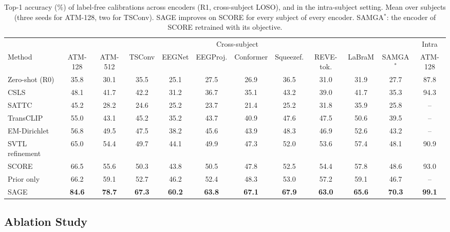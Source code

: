 \documentclass[10pt,twocolumn,letterpaper]{article}
\begin{document}
\begin{table}[t]
\caption{Top-1 accuracy (\%) of label-free calibrations across encoders (R1, cross-subject LOSO), and in the intra-subject setting. Mean over subjects (three seeds for ATM-128, two for TSConv). SAGE improves on SCORE for every subject of every encoder. SAMGA$^\ast$: the encoder of SCORE retrained with its objective.}
\label{tab:encoders}
\centering
\footnotesize
\setlength{\tabcolsep}{3pt}
\begin{tabular}{@{}lcccccccccc|c@{}}
\toprule
 & \multicolumn{10}{c|}{Cross-subject} & Intra \\
\cmidrule(lr){2-11}
Method & ATM-128 & ATM-512 & TSConv & EEGNet & EEGProj. & Conformer & Squeezef. & REVE-tok. & LaBraM & SAMGA$^\ast$ & ATM-128 \\
\midrule
Zero-shot (R0) & 35.8 & 30.1 & 35.5 & 25.1 & 27.5 & 26.9 & 36.5 & 31.0 & 31.9 & 27.7 & 87.8 \\
CSLS & 48.1 & 41.7 & 42.2 & 31.2 & 36.7 & 35.1 & 43.2 & 39.0 & 41.7 & 35.3 & 94.3 \\
SATTC~\cite{huang2026sattc} & 45.2 & 28.2 & 24.6 & 25.2 & 23.7 & 21.4 & 25.2 & 31.8 & 35.9 & 25.8 & -- \\
TransCLIP~\cite{zanella2024transclip} & 55.0 & 43.1 & 45.2 & 35.2 & 43.7 & 40.9 & 47.6 & 47.5 & 50.6 & 39.5 & -- \\
EM-Dirichlet~\cite{martin2024transductive} & 56.8 & 49.5 & 47.5 & 38.2 & 45.6 & 43.9 & 48.3 & 46.9 & 52.6 & 43.2 & -- \\
SVTL refinement~\cite{yadav2026svtl} & 65.0 & 54.4 & 49.7 & 44.1 & 49.9 & 47.3 & 52.0 & 53.6 & 57.4 & 48.1 & 90.9 \\
SCORE~\cite{cui2026score} & 66.5 & 55.6 & 50.3 & 43.8 & 50.5 & 47.8 & 52.5 & 54.4 & 57.8 & 48.6 & 93.0 \\
Prior only & 66.2 & 59.1 & 52.7 & 46.2 & 52.4 & 48.3 & 53.0 & 57.2 & 59.1 & 46.7 & -- \\
\midrule
SAGE & \textbf{84.6} & \textbf{78.7} & \textbf{67.3} & \textbf{60.2} & \textbf{63.8} & \textbf{67.1} & \textbf{67.9} & \textbf{63.0} & \textbf{65.6} & \textbf{70.3} & \textbf{99.1} \\
\bottomrule
\end{tabular}
\end{table}

\subsection{Ablation Study}
\label{sec:ablation}
\end{document}
